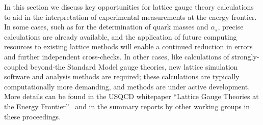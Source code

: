 In this section we discuss key opportunities for lattice gauge theory
calculations to aid in the interpretation of experimental measurements at the
energy frontier.  In some cases, such as for the determination of quark masses
and $\alpha_s$, precise calculations are already available, and the
application of future computing resources to existing lattice methods will
enable a continued reduction in errors and further independent cross-checks.
In other cases, like calculations of strongly-coupled beyond-the Standard
Model gauge theories, new lattice simulation software and analysis methods are
required; these calculations are typically computationally more demanding, and
methods are under active development.  More details can be found in the USQCD
whitepaper ``Lattice Gauge Theories at the Energy
Frontier''~\cite{USQCD_EF_whitepaper13} and in the summary reports by other
working groups in these proceedings.

